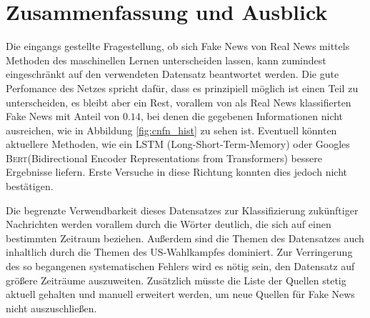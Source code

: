 \chapter{Zusammenfassung und Ausblick}
Die eingangs gestellte Fragestellung, ob sich Fake News von Real News mittels 
Methoden des maschinellen Lernen unterscheiden lassen, kann zumindest eingeschränkt
auf den verwendeten Datensatz beantwortet werden. Die gute Perfomance des Netzes spricht 
dafür, dass es prinzipiell möglich ist einen Teil zu unterscheiden, es bleibt aber ein 
Rest, vorallem von als Real News klassifierten Fake News mit Anteil von $0.14$, bei 
denen die gegebenen Informationen nicht ausreichen, wie in Abbildung \ref{fig:cnfn_hist}
zu sehen ist. Eventuell könnten aktuellere Methoden, wie ein LSTM (Long-Short-Term-Memory)
oder Googles \textsc{Bert}(Bidirectional Encoder Representations from Transformers) bessere
Ergebnisse liefern. Erste Versuche in diese Richtung konnten dies jedoch nicht bestätigen.

Die begrenzte Verwendbarkeit dieses Datensatzes zur Klassifizierung zukünftiger Nachrichten  
werden vorallem durch die Wörter deutlich, die sich auf einen bestimmten Zeitraum beziehen.
Außerdem sind die Themen des Datensatzes auch inhaltlich durch die Themen des US-Wahlkampfes 
dominiert. Zur Verringerung des so begangenen systematischen Fehlers wird es nötig sein,
den Datensatz auf größere Zeiträume auszuweiten. Zusätzlich müsste die Liste der Quellen
stetig aktuell gehalten und manuell erweitert werden, um neue Quellen für Fake News 
nicht auszuschließen.